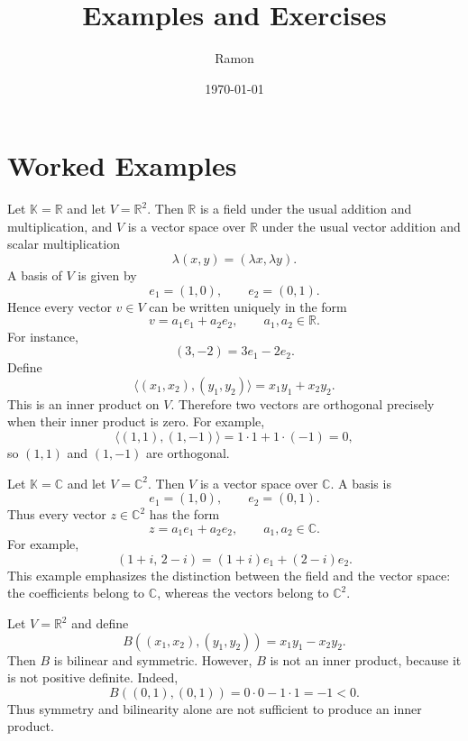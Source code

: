 \documentclass{article}
\begin{document}
\title{Examples and Exercises}
\author{Ramon}
\date{\today}

\maketitle

\section{Worked Examples}

\begin{example}
Let $\mathbb{K}=\mathbb{R}$ and let $V=\mathbb{R}^2$. Then $\mathbb{R}$ is a field under the usual addition and multiplication, and $V$ is a vector space over $\mathbb{R}$ under the usual vector addition and scalar multiplication
$$
\lambda(x,y)=(\lambda x,\lambda y).
$$
A basis of $V$ is given by
$$
e_1=(1,0),\qquad e_2=(0,1).
$$
Hence every vector $v\in V$ can be written uniquely in the form
$$
v=a_1e_1+a_2e_2,
\qquad a_1,a_2\in\mathbb{R}.
$$
For instance,
$$
(3,-2)=3e_1-2e_2.
$$
Define
$$
\langle (x_1,x_2),(y_1,y_2)\rangle=x_1y_1+x_2y_2.
$$
This is an inner product on $V$. Therefore two vectors are orthogonal precisely when their inner product is zero. For example,
$$
\langle (1,1),(1,-1)\rangle=1\cdot 1+1\cdot(-1)=0,
$$
so $(1,1)$ and $(1,-1)$ are orthogonal.
\end{example}

\begin{example}
Let $\mathbb{K}=\mathbb{C}$ and let $V=\mathbb{C}^2$. Then $V$ is a vector space over $\mathbb{C}$. A basis is
$$
e_1=(1,0),\qquad e_2=(0,1).
$$
Thus every vector $z\in \mathbb{C}^2$ has the form
$$
z=a_1e_1+a_2e_2,
\qquad a_1,a_2\in\mathbb{C}.
$$
For example,
$$
(1+i,\,2-i)=(1+i)e_1+(2-i)e_2.
$$
This example emphasizes the distinction between the field and the vector space: the coefficients belong to $\mathbb{C}$, whereas the vectors belong to $\mathbb{C}^2$.
\end{example}

\begin{example}
Let $V=\mathbb{R}^2$ and define
$$
B((x_1,x_2),(y_1,y_2))=x_1y_1-x_2y_2.
$$
Then $B$ is bilinear and symmetric. However, $B$ is not an inner product, because it is not positive definite. Indeed,
$$
B((0,1),(0,1))=0\cdot 0-1\cdot 1=-1<0.
$$
Thus symmetry and bilinearity alone are not sufficient to produce an inner product.
\end{example}
\end{document}
